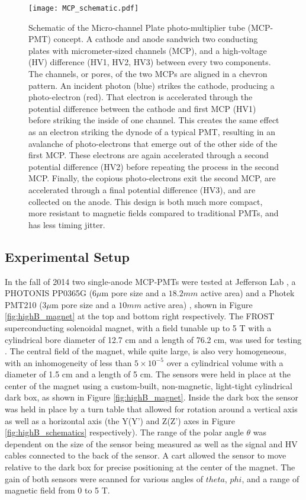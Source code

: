 \begin{figure}[!htb]
	\centering
	\texttt{[image: MCP\_schematic.pdf]}
	\caption{Schematic of the Micro-channel Plate photo-multiplier tube (MCP-PMT) concept. A cathode and anode sandwich two conducting plates with micrometer-sized channels (MCP), and a high-voltage (HV) difference (HV1, HV2, HV3) between every two components. The channels, or pores, of the two MCPs are aligned in a chevron pattern. An incident photon (blue) strikes the cathode, producing a photo-electron (red). That electron is accelerated through the potential difference between the cathode and first MCP (HV1) before striking the inside of one channel. This creates the same effect as an electron striking the dynode of a typical PMT, resulting in an avalanche of photo-electrons that emerge out of the other side of the first MCP. These electrons are again accelerated through a second potential difference (HV2) before repeating the process in the second MCP. Finally, the copious photo-electrons exit the second MCP, are accelerated through a final potential difference (HV3), and are collected on the anode. This design is both much more compact, more resistant to magnetic fields compared to traditional PMTs, and has less timing jitter. }
	\label{fig:MCP_schematic}
\end{figure}

\subsection{Experimental Setup}
In the fall of 2014 two single-anode MCP-PMTs were tested at Jefferson Lab \cite{HighB_DIRC2015}, a PHOTONIS PP0365G ($6 \mu\text{m}$ pore size and a $18.2 \unit{mm}$ active area) \cite{PHOTONIS} and a Photek PMT210 ($3 \mu\text{m}$ pore size and a $10 \unit{mm}$ active area)  \cite{Photek}, shown in Figure \ref{fig:highB_magnet} at the top and bottom right respectively. The FROST  superconducting solenoidal magnet, with a field tunable up to 5 T with a cylindrical bore diameter of 12.7 cm and a length of 76.2 cm, was used for testing \cite{JLab_FrozenTarget}. The central field of the magnet, while quite large, is also very homogeneous, with an inhomogeneity of less than $5\times10^{-5}$ over a cylindrical volume with a diameter of 1.5 cm and a length of 5 cm. The sensors were held in place at the center of the magnet using a custom-built, non-magnetic, light-tight cylindrical dark box, as shown in Figure \ref{fig:highB_magnet}. Inside the dark box the sensor was held in place by a turn table that allowed for rotation around a vertical axis as well as a horizontal axis (the Y(Y') and Z(Z') axes in Figure \ref{fig:highB_schematics} respectively). The range of the polar angle $\theta$ was dependent on the size of the sensor being measured as well as the signal and HV cables connected to the back of the sensor. A cart allowed the sensor to move relative to the dark box for precise positioning at the center of the magnet. The gain of both sensors were scanned for various angles of $theta$, $phi$, and a range of magnetic field from 0 to 5 T.

